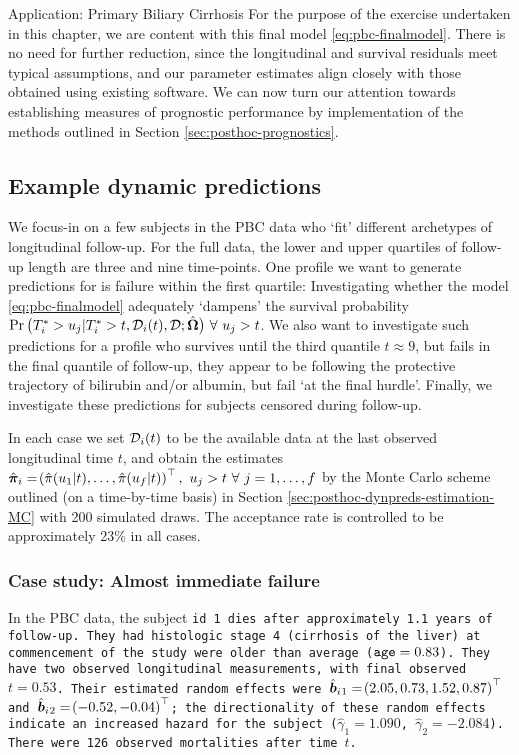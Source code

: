 \begin{chapter}{\label{cha:app-PBC}Application: Primary Biliary Cirrhosis}
  For the purpose of the exercise undertaken in this chapter, we are content with this final model \eqref{eq:pbc-finalmodel}. There is no need for further reduction, since the longitudinal and survival residuals meet typical assumptions, and our parameter estimates align closely with those obtained using existing software. We can now turn our attention towards establishing measures of prognostic performance by implementation of the methods outlined in Section \ref{sec:posthoc-prognostics}.

  \subsection{Example dynamic predictions}\label{sec:pbc-final-model-dynpreds}
  We focus-in on a few subjects in the PBC data who `fit' different archetypes of longitudinal follow-up. For the full data, the lower and upper quartiles of follow-up length are three and nine time-points. One profile we want to generate predictions for is failure within the first quartile: Investigating whether the model \eqref{eq:pbc-finalmodel} adequately `dampens' the survival probability $\Pr\big( T_i^*> u_j|T_i^*>t,\mathcal{D}_i(t),\mathcal{D};\hbO\big)\ \forall\ u_j > t$. We also want to investigate such predictions for a profile who survives until the third quantile $t\approx9$, but fails in the final quantile of follow-up, \ie they appear to be following the protective trajectory of bilirubin and/or albumin, but fail `at the final hurdle'. Finally, we investigate these predictions for subjects censored during follow-up.
  
  In each case we set $\mathcal{D}_i\lb t\rb$ to be the available data at the last observed longitudinal time $t$, and obtain the estimates $\hat{\bm{\pi}}_i=\lb\hat{\pi}(u_1|t),\dots,\hat{\pi}(u_f|t)\rb^\top,\ u_j>t\ \forall\ j=1,\dots,f$ by the Monte Carlo scheme outlined (on a time-by-time basis) in Section \ref{sec:posthoc-dynpreds-estimation-MC} with 200 simulated draws. The acceptance rate is controlled to be approximately 23\% in all cases.

  \rmtoc
  \subsubsection{Case study: Almost immediate failure}
  In the PBC data, the subject \tt{id} 1 dies after approximately 1.1 years of follow-up. They had \tt{histologic} stage 4 (\ie cirrhosis of the liver) at commencement of the study were older than average ($\tt{age}=0.83$). They have two observed longitudinal measurements, with final observed $t = 0.53$. Their estimated random effects were $\hb{_1}=\lb2.05,0.73,1.52,0.87\rb^\top$ and $\hb{_2}=\lb-0.52,-0.04\rb^\top$; the directionality of these random effects indicate an increased hazard for the subject ($\hat{\gamma}_1=1.090$, $\hat{\gamma}_2=-2.084$). There were 126 observed mortalities after time $t$.


\end{chapter}
